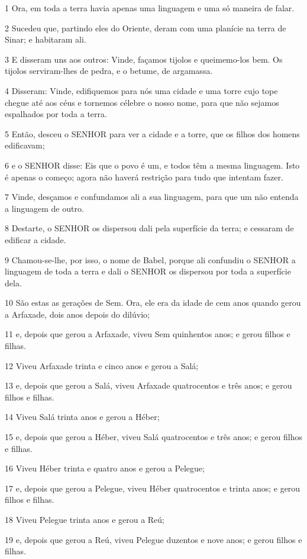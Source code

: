 \par 1 Ora, em toda a terra havia apenas uma linguagem e uma só maneira de falar.
\par 2 Sucedeu que, partindo eles do Oriente, deram com uma planície na terra de Sinar; e habitaram ali.
\par 3 E disseram uns aos outros: Vinde, façamos tijolos e queimemo-los bem. Os tijolos serviram-lhes de pedra, e o betume, de argamassa.
\par 4 Disseram: Vinde, edifiquemos para nós uma cidade e uma torre cujo tope chegue até aos céus e tornemos célebre o nosso nome, para que não sejamos espalhados por toda a terra.
\par 5 Então, desceu o SENHOR para ver a cidade e a torre, que os filhos dos homens edificavam;
\par 6 e o SENHOR disse: Eis que o povo é um, e todos têm a mesma linguagem. Isto é apenas o começo; agora não haverá restrição para tudo que intentam fazer.
\par 7 Vinde, desçamos e confundamos ali a sua linguagem, para que um não entenda a linguagem de outro.
\par 8 Destarte, o SENHOR os dispersou dali pela superfície da terra; e cessaram de edificar a cidade.
\par 9 Chamou-se-lhe, por isso, o nome de Babel, porque ali confundiu o SENHOR a linguagem de toda a terra e dali o SENHOR os dispersou por toda a superfície dela.
\par 10 São estas as gerações de Sem. Ora, ele era da idade de cem anos quando gerou a Arfaxade, dois anos depois do dilúvio;
\par 11 e, depois que gerou a Arfaxade, viveu Sem quinhentos anos; e gerou filhos e filhas.
\par 12 Viveu Arfaxade trinta e cinco anos e gerou a Salá;
\par 13 e, depois que gerou a Salá, viveu Arfaxade quatrocentos e três anos; e gerou filhos e filhas.
\par 14 Viveu Salá trinta anos e gerou a Héber;
\par 15 e, depois que gerou a Héber, viveu Salá quatrocentos e três anos; e gerou filhos e filhas.
\par 16 Viveu Héber trinta e quatro anos e gerou a Pelegue;
\par 17 e, depois que gerou a Pelegue, viveu Héber quatrocentos e trinta anos; e gerou filhos e filhas.
\par 18 Viveu Pelegue trinta anos e gerou a Reú;
\par 19 e, depois que gerou a Reú, viveu Pelegue duzentos e nove anos; e gerou filhos e filhas.
